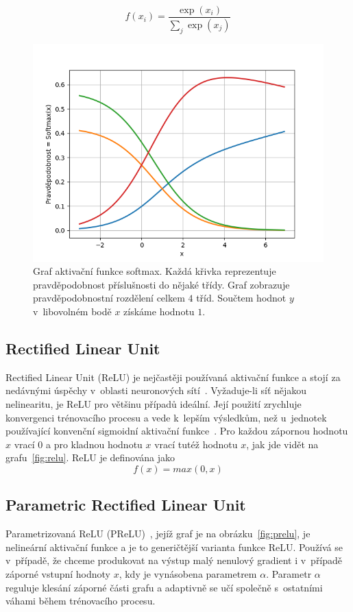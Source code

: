 \begin{equation}
  f(x_i) = \frac{\exp(x_i)}{\sum_j \exp(x_j)}
\end{equation}


\begin{figure}[H]
    \centering
    \includegraphics[scale=0.75]{obrazky-figures/softmax.png}
    \caption{\label{fig:softmax}Graf aktivační funkce softmax. Každá křivka reprezentuje pravděpodobnost příslušnosti do nějaké třídy. Graf zobrazuje pravděpodobnostní rozdělení celkem $4$ tříd. Součtem hodnot $y$ v~libovolném bodě $x$ získáme hodnotu $1$.}
\end{figure}


\subsection*{Rectified Linear Unit}
\label{relu}
Rectified Linear Unit (ReLU) je nejčastěji používaná aktivační funkce a stojí za nedávnými úspěchy v~oblasti neuronových sítí~\cite{NIPS2012_4824}. Vyžaduje-li síť nějakou nelinearitu, je ReLU pro většinu případů ideální. Její použití zrychluje konvergenci trénovacího procesu a vede k~lepším výsledkům, než u~jednotek používající konvenční sigmoidní aktivační funkce~\cite{40811}. Pro každou zápornou hodnotu $x$ vrací $0$ a pro kladnou hodnotu $x$ vrací tutéž hodnotu $x$, jak jde vidět na grafu~\ref{fig:relu}. ReLU je definována jako 
\begin{equation}
   f(x)=max(0,x)
\end{equation}


\subsection*{Parametric Rectified Linear Unit}
Parametrizovaná ReLU (PReLU)~\cite{he2015delving}, jejíž graf je na obrázku~\ref{fig:prelu}, je nelineární aktivační funkce a je to generičtější varianta funkce ReLU. Používá se v~případě, že chceme produkovat na výstup malý nenulový gradient i v~případě záporné vstupní hodnoty $x$, kdy je vynásobena parametrem $\alpha$. Parametr $\alpha$ reguluje klesání záporné části grafu a adaptivně se učí společně s~ostatními váhami během trénovacího procesu.

